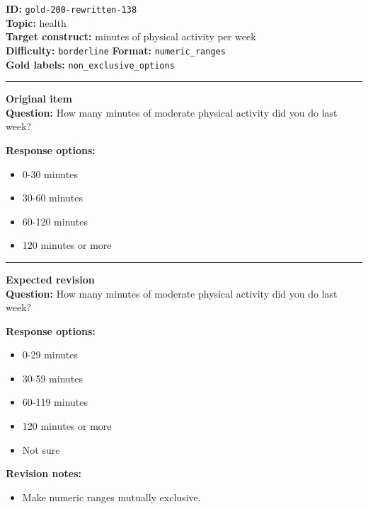 \documentclass[10pt,a4paper]{article}
\newcommand{\sectionline}{\vspace{0.15em}\hrule\vspace{0.35em}}
\begin{document}
\begin{tcolorbox}[colframe=FlawRed,colback=white,colbacktitle=FlawRed!9,coltitle=black,title={Item 138\hfill Flawed item}]
\textbf{ID:} \texttt{gold-200-rewritten-138}\\
\textbf{Topic:} health\\
\textbf{Target construct:} minutes of physical activity per week\\
\textbf{Difficulty:} \texttt{borderline} \quad \textbf{Format:} \texttt{numeric\_ranges}\\
\textbf{Gold labels:} \texttt{non\_exclusive\_options}\\
\sectionline
\textbf{Original item}\\
\textbf{Question:} How many minutes of moderate physical activity did you do last week?
\par\textbf{Response options:}
\begin{itemize}
\item 0-30 minutes
\item 30-60 minutes
\item 60-120 minutes
\item 120 minutes or more
\end{itemize}
\sectionline
\textbf{Expected revision}\\
\textbf{Question:} How many minutes of moderate physical activity did you do last week?
\par\textbf{Response options:}
\begin{itemize}
\item 0-29 minutes
\item 30-59 minutes
\item 60-119 minutes
\item 120 minutes or more
\item Not sure
\end{itemize}
\par\textbf{Revision notes:}
\begin{itemize}
\item Make numeric ranges mutually exclusive.
\end{itemize}
\end{tcolorbox}
\end{document}
